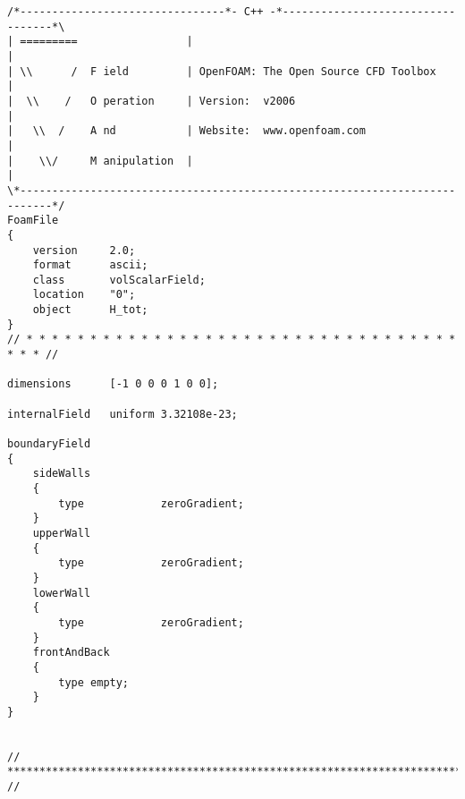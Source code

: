 \begin{lstlisting}[style=cpp,title=\texttt{0/H\_tot},captionpos=t]
/*--------------------------------*- C++ -*----------------------------------*\
| =========                 |                                                 |
| \\      /  F ield         | OpenFOAM: The Open Source CFD Toolbox           |
|  \\    /   O peration     | Version:  v2006                                 |
|   \\  /    A nd           | Website:  www.openfoam.com                      |
|    \\/     M anipulation  |                                                 |
\*---------------------------------------------------------------------------*/
FoamFile
{
    version     2.0;
    format      ascii;
    class       volScalarField;
    location    "0";
    object      H_tot;
}
// * * * * * * * * * * * * * * * * * * * * * * * * * * * * * * * * * * * * * //

dimensions      [-1 0 0 0 1 0 0];

internalField   uniform 3.32108e-23;

boundaryField
{
    sideWalls
    {
        type            zeroGradient;
    }
    upperWall
    {
        type            zeroGradient;
    }
    lowerWall
    {
        type            zeroGradient;
    }
    frontAndBack
    { 
        type empty;
    }
}


// ************************************************************************* //


\end{lstlisting}

